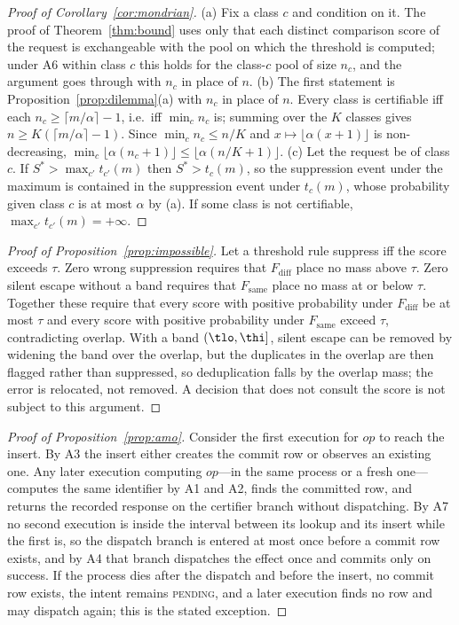 \begin{proof}[Proof of Corollary~\ref{cor:mondrian}]
(a) Fix a class $c$ and condition on it. The proof of Theorem~\ref{thm:bound} uses only that each distinct comparison score of the request is exchangeable with the pool on which the threshold is computed; under A6 within class $c$ this holds for the class-$c$ pool of size $n_c$, and the argument goes through with $n_c$ in place of $n$. (b) The first statement is Proposition~\ref{prop:dilemma}(a) with $n_c$ in place of $n$. Every class is certifiable iff each $n_c\ge\lceil m/\alpha\rceil-1$, i.e.\ iff $\min_c n_c$ is; summing over the $K$ classes gives $n\ge K(\lceil m/\alpha\rceil-1)$. Since $\min_c n_c\le n/K$ and $x\mapsto\lfloor\alpha(x+1)\rfloor$ is non-decreasing, $\min_c\lfloor\alpha(n_c+1)\rfloor\le\lfloor\alpha(n/K+1)\rfloor$. (c) Let the request be of class $c$. If $S^\ast>\max_{c'}t_{c'}(m)$ then $S^\ast>t_c(m)$, so the suppression event under the maximum is contained in the suppression event under $t_c(m)$, whose probability given class $c$ is at most $\alpha$ by (a). If some class is not certifiable, $\max_{c'}t_{c'}(m)=+\infty$.
\end{proof}

\begin{proof}[Proof of Proposition~\ref{prop:impossible}]
Let a threshold rule suppress iff the score exceeds $\tau$. Zero wrong suppression requires that $F_{\mathrm{diff}}$ place no mass above $\tau$. Zero silent escape without a band requires that $F_{\mathrm{same}}$ place no mass at or below $\tau$. Together these require that every score with positive probability under $F_{\mathrm{diff}}$ be at most $\tau$ and every score with positive probability under $F_{\mathrm{same}}$ exceed $\tau$, contradicting overlap. With a band $(\tlo,\thi]$, silent escape can be removed by widening the band over the overlap, but the duplicates in the overlap are then flagged rather than suppressed, so deduplication falls by the overlap mass; the error is relocated, not removed. A decision that does not consult the score is not subject to this argument.
\end{proof}

\begin{proof}[Proof of Proposition~\ref{prop:amo}]
Consider the first execution for $\mathit{op}$ to reach the insert. By A3 the insert either creates the commit row or observes an existing one. Any later execution computing $\mathit{op}$---in the same process or a fresh one---computes the same identifier by A1 and A2, finds the committed row, and returns the recorded response on the certifier branch without dispatching. By A7 no second execution is inside the interval between its lookup and its insert while the first is, so the dispatch branch is entered at most once before a commit row exists, and by A4 that branch dispatches the effect once and commits only on success. If the process dies after the dispatch and before the insert, no commit row exists, the intent remains \textsc{pending}, and a later execution finds no row and may dispatch again; this is the stated exception.
\end{proof}

